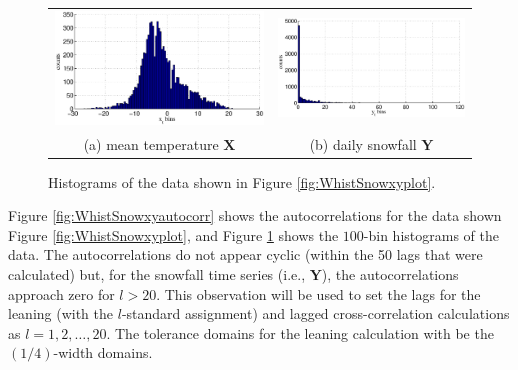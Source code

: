 \begin{figure}[ht]
\begin{tabular}{cc}
\includegraphics[scale=0.5]{WhistlerDailyExample_Xhist.eps} & \includegraphics[scale=0.5]{WhistlerDailyExample_Yhist.eps} \\
(a) mean temperature $\mathbf{X}$ & (b) daily snowfall $\mathbf{Y}$
\end{tabular}
\caption{Histograms of the data shown in Figure \ref{fig:WhistSnowxyplot}.}
\label{fig:WhistSnowxyhist}
\end{figure}

Figure \ref{fig:WhistSnowxyautocorr} shows the autocorrelations for the data shown Figure \ref{fig:WhistSnowxyplot}, and Figure \ref{fig:WhistSnowxyhist} shows the $100$-bin histograms of the data.  The autocorrelations do not appear cyclic (within the 50 lags that were calculated) but, for the snowfall time series (i.e., $\mathbf{Y}$), the autocorrelations approach zero for $l>20$.  This observation will be used to set the lags for the leaning (with the $l$-standard assignment) and lagged cross-correlation calculations as $l=1,2,\ldots,20$.  The tolerance domains for the leaning calculation with be the $(1/4)$-width domains.

